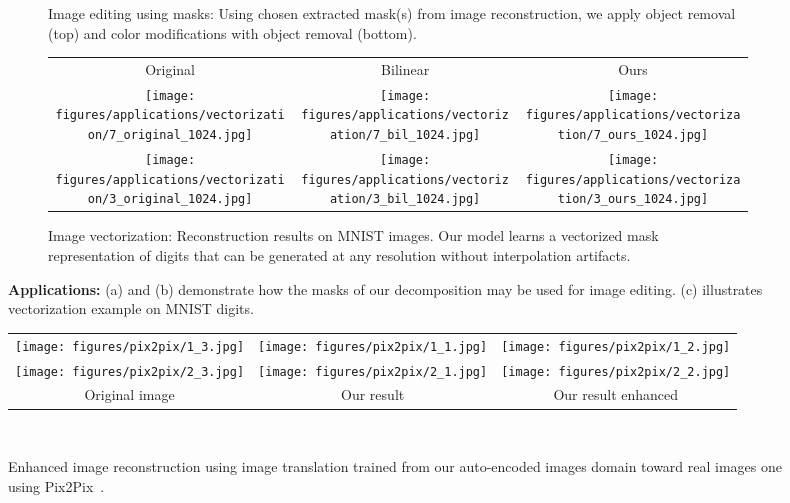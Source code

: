 \documentclass[10pt,twocolumn,letterpaper]{article}
\begin{document}
\begin{figure*}[ht]
\begin{subfigure}[t]{0.32\textwidth}
\begin{tabular}{ccc}
		\end{tabular}
		\caption{Image editing using masks: Using chosen extracted mask(s) from image reconstruction, we apply   object removal (top) and color modifications with object removal (bottom).}
		\label{fig:grouped_applications:b}
	\end{subfigure}
	\hfill
	\begin{subfigure}[t]{0.32\textwidth}
		\begin{tabular}{ccc}
		    Original & Bilinear & Ours \\
            \texttt{[image: figures/applications/vectorization/7\_original\_1024.jpg]}&
            \texttt{[image: figures/applications/vectorization/7\_bil\_1024.jpg]}&
            \texttt{[image: figures/applications/vectorization/7\_ours\_1024.jpg]} \\
            \texttt{[image: figures/applications/vectorization/3\_original\_1024.jpg]}&
            \texttt{[image: figures/applications/vectorization/3\_bil\_1024.jpg]}&
            \texttt{[image: figures/applications/vectorization/3\_ours\_1024.jpg]}
		\end{tabular}
		\caption{Image vectorization: Reconstruction results on MNIST images. Our model learns a vectorized mask representation of digits that can be generated at any resolution without interpolation artifacts.}
		\label{fig:grouped_applications:c}
	\end{subfigure}
     \caption{\textbf{Applications:} (a) and (b) demonstrate how the masks of our decomposition may be used for image editing. (c) illustrates vectorization example on MNIST digits.} 	\label{fig:grouped_applications}
\end{figure*}

\begin{figure}[!th]
\begin{center}
\begin{tabular}{ccc}
\texttt{[image: figures/pix2pix/1\_3.jpg]}& \texttt{[image: figures/pix2pix/1\_1.jpg]}&
\texttt{[image: figures/pix2pix/1\_2.jpg]}\\
\texttt{[image: figures/pix2pix/2\_3.jpg]}& \texttt{[image: figures/pix2pix/2\_1.jpg]}&
\texttt{[image: figures/pix2pix/2\_2.jpg]}\\
Original image & Our result & Our result enhanced \\  
\end{tabular}\\
\vspace{-5mm}

\end{center}
   \caption{Enhanced image reconstruction using image translation trained from our auto-encoded images domain toward real images one using Pix2Pix~\cite{Isola2016ImageToImage}.}
\label{fig:pix2pix_fish}
\end{figure}
\end{document}
